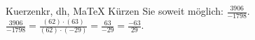 \begin{MAufgabe}{Kuerzen}{kr, dh, MaTeX}
K\"urzen Sie soweit m\"oglich: $\frac{3906}{-1798}$.\\ 
\ifLsg\MLoesung
\quad $\frac{3906}{-1798}=\frac{(62)\cdot(63)}{(62)\cdot(-29)}=\frac{63}{-29}=\frac{-63}{29}$.\else\relax\fi
 \end{MAufgabe}
